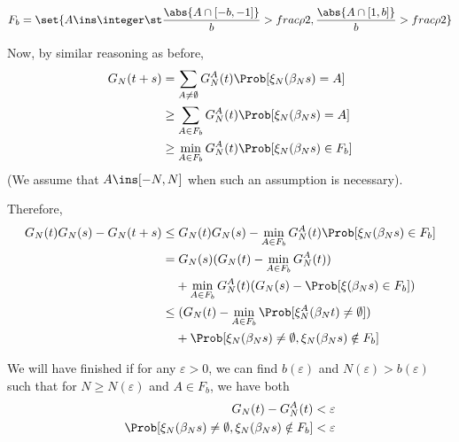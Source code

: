 \documentclass{scrartcl}
\newcommand{\ep}{\varepsilon}
\begin{document}
\[ F_{b} = \set{A \ins \integer \st \frac{\abs{A \cap [-b,-1]}}{b} > frac{\rho}{2}, \frac{\abs{A \cap [1,b]}}{b} > frac{\rho}{2}} \]


Now, by similar reasoning as before,
\begin{align*}
  G_{N}(t+s) &= \sum_{A \neq \emptyset} G_{N}^{A}(t) \Prob[\xi_{N}(\beta_{N}s) = A] \\
  &\geq \sum_{A \in F_{b}} G_{N}^{A}(t) \Prob[\xi_{N}(\beta_{N}s) = A] \\
  &\geq \min_{A \in F_{b}} G_{N}^{A}(t) \Prob[\xi_{N}(\beta_{N}s) \in F_{b}]
\end{align*}
(We assume that $A \ins [-N,N]$ when such an assumption is necessary).

Therefore,
\begin{align*}
  G_{N}(t)G_{N}(s) - G_{N}(t+s) \leq& \; G_{N}(t)G_{N}(s) - \min_{A \in F_{b}} G_{N}^{A}(t) \Prob[\xi_{N}(\beta_{N}s) \in F_{b}] \\
  =& \; G_{N}(s)(G_{N}(t) - \min_{A \in F_{b}} G_{N}^{A}(t)) \\
                                 &+ \min_{A \in F_{b}} G_{N}^{A}(t)(G_{N}(s) - \Prob[\xi(\beta_{N}s) \in F_{b}]) \\
  \leq& \; (G_{N}(t) - \min_{A \in F_{b}} \Prob[\xi_{N}^{A}(\beta_{N}t) \neq \emptyset]) \\
                                 &+ \Prob[\xi_{N}(\beta_{N}s) \neq \emptyset, \xi_{N}(\beta_{N}s) \notin F_{b}]
\end{align*}

We will have finished if for any $\ep > 0$, we can find $b(\ep)$ and $N(\ep) > b(\ep)$  such that for $N \geq N(\ep)$ and $A \in F_{b}$, we have both
\begin{align}
  G_{N}(t) - G_{N}^{A}(t) &< \ep \label{eq:firstineq} \\
  \Prob[\xi_{N}(\beta_{N}s) \neq \emptyset, \xi_{N}(\beta_{N}s) \notin F_{b}] &< \ep \label{eq:secondineq}
\end{align}
\end{document}
